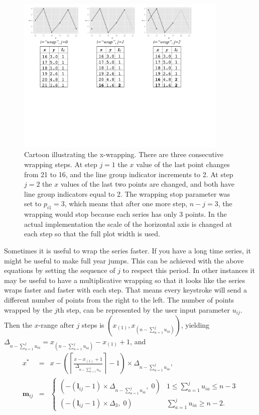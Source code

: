 \documentclass[12pt]{article}
\begin{document}
\begin{itemize}
\begin{center}
\begin{figure}[htp]
\centerline{\includegraphics[width=0.9\textwidth]{graph/wrap-example.pdf}}
\caption{\label{fig:x-wrapping-algorithm} Cartoon illustrating
the x-wrapping. There are three consecutive wrapping
steps. At step $j=1$ the $x$ value of the last point changes
from 21 to 16, and the line group indicator increments to 2.
At step $j=2$ the $x$ values of the last two points are changed,
and both have line group indicators equal to 2.  The wrapping
stop parameter was set to $p_{i1}=3$, which means that after
one more step, $n-j=3$, the wrapping would stop because each
series has only 3 points. In the actual implementation the
scale of the horizontal axis is changed at each step so that
the full plot width is used.}
\end{figure}
\end{center}

Sometimes it is useful to wrap the series faster. If you have
a long time series, it might be useful to make full year jumps.
This can be achieved with the above equations by setting the
sequence of $j$ to respect this period. In other instances it
may be useful to have a multiplicative wrapping so that it
looks like the series wraps faster and faster with each step.
That means every keystroke will send a different number of
points from the right to the left. The number of points
wrapped by the $j$th step, can be represented by the user
input parameter $u_{ij}$. Then the $x$-range after $j$ steps
is $(x_{(1)}, x_{(n-\sum_{a=1}^j u_{ia})})$, yielding
$\Delta_{n-\sum_{a=1}^j u_{ia}}=x_{(n-\sum_{a=1}^j u_{ia})}-x_{(1)}+1$, and
\begin{eqnarray*}
x^* & = & x-\left(\left\lceil \frac{x-x_{(1)}+1}{\Delta_{n-\sum_{a=1}^j u_{ia}}}\right\rceil -1\right)\times\Delta_{n-\sum_{a=1}^j u_{ia}}, \\
\mathbf{m}{}_{ij} & = & \begin{cases}
(-(\mathbf{l}{}_{ij} -1)\times\Delta_{n-\sum_{a=1}^j u_{ia}}, \; 0) & 1\leq \sum_{a=1}^j u_{ia} \leq n-3 \\
(-(\mathbf{l}{}_{ij} -1)\times\Delta_3, \; 0) & \sum_{a=1}^j u_{ia}\ge n-2.
\end{cases}
\end{eqnarray*}


\end{itemize}
\end{document}
